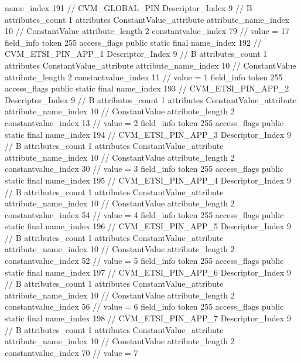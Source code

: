 {{{{{				name_index	191		// CVM_GLOBAL_PIN
				Descriptor_Index	9		// B
				attributes_count	1
				attributes {
				ConstantValue_attribute {
					attribute_name_index	10		// ConstantValue
					attribute_length	2
					constantvalue_index	79		// value = 17
				}
				}
			}
			field_info {
				token	255
				access_flags	public static final
				name_index	192		// CVM_ETSI_PIN_APP_1
				Descriptor_Index	9		// B
				attributes_count	1
				attributes {
				ConstantValue_attribute {
					attribute_name_index	10		// ConstantValue
					attribute_length	2
					constantvalue_index	11		// value = 1
				}
				}
			}
			field_info {
				token	255
				access_flags	public static final
				name_index	193		// CVM_ETSI_PIN_APP_2
				Descriptor_Index	9		// B
				attributes_count	1
				attributes {
				ConstantValue_attribute {
					attribute_name_index	10		// ConstantValue
					attribute_length	2
					constantvalue_index	13		// value = 2
				}
				}
			}
			field_info {
				token	255
				access_flags	public static final
				name_index	194		// CVM_ETSI_PIN_APP_3
				Descriptor_Index	9		// B
				attributes_count	1
				attributes {
				ConstantValue_attribute {
					attribute_name_index	10		// ConstantValue
					attribute_length	2
					constantvalue_index	30		// value = 3
				}
				}
			}
			field_info {
				token	255
				access_flags	public static final
				name_index	195		// CVM_ETSI_PIN_APP_4
				Descriptor_Index	9		// B
				attributes_count	1
				attributes {
				ConstantValue_attribute {
					attribute_name_index	10		// ConstantValue
					attribute_length	2
					constantvalue_index	54		// value = 4
				}
				}
			}
			field_info {
				token	255
				access_flags	public static final
				name_index	196		// CVM_ETSI_PIN_APP_5
				Descriptor_Index	9		// B
				attributes_count	1
				attributes {
				ConstantValue_attribute {
					attribute_name_index	10		// ConstantValue
					attribute_length	2
					constantvalue_index	52		// value = 5
				}
				}
			}
			field_info {
				token	255
				access_flags	public static final
				name_index	197		// CVM_ETSI_PIN_APP_6
				Descriptor_Index	9		// B
				attributes_count	1
				attributes {
				ConstantValue_attribute {
					attribute_name_index	10		// ConstantValue
					attribute_length	2
					constantvalue_index	56		// value = 6
				}
				}
			}
			field_info {
				token	255
				access_flags	public static final
				name_index	198		// CVM_ETSI_PIN_APP_7
				Descriptor_Index	9		// B
				attributes_count	1
				attributes {
				ConstantValue_attribute {
					attribute_name_index	10		// ConstantValue
					attribute_length	2
					constantvalue_index	70		// value = 7
}}}}}}}
